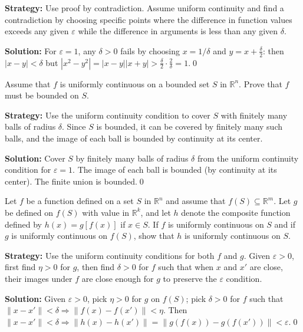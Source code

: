 \noindent\textbf{Strategy:} Use proof by contradiction. Assume uniform continuity and find a contradiction by choosing specific points where the difference in function values exceeds any given $\varepsilon$ while the difference in arguments is less than any given $\delta$.

\bigskip\noindent\textbf{Solution:}
For $\varepsilon=1$, any $\delta>0$ fails by choosing $x=1/\delta$ and $y=x+\tfrac{\delta}{2}$: then $|x-y|<\delta$ but $|x^2-y^2|=|x-y||x+y|>\tfrac{\delta}{2}\cdot\tfrac{2}{\delta}=1$.\qed



\begin{problembox}
Assume that $f$ is uniformly continuous on a bounded set $S$ in $\mathbb{R}^n$. Prove that $f$ must be bounded on $S$.
\end{problembox}

\noindent\textbf{Strategy:} Use the uniform continuity condition to cover $S$ with finitely many balls of radius $\delta$. Since $S$ is bounded, it can be covered by finitely many such balls, and the image of each ball is bounded by continuity at its center.

\bigskip\noindent\textbf{Solution:}
Cover $S$ by finitely many balls of radius $\delta$ from the uniform continuity condition for $\varepsilon=1$. The image of each ball is bounded (by continuity at its center). The finite union is bounded.\qed



\begin{problembox}
Let $f$ be a function defined on a set $S$ in $\mathbb{R}^n$ and assume that $f(S) \subseteq \mathbb{R}^m$. Let $g$ be defined on $f(S)$ with value in $\mathbb{R}^k$, and let $h$ denote the composite function defined by $h(x) = g[f(x)]$ if $x \in S$. If $f$ is uniformly continuous on $S$ and if $g$ is uniformly continuous on $f(S)$, show that $h$ is uniformly continuous on $S$.
\end{problembox}

\noindent\textbf{Strategy:} Use the uniform continuity conditions for both $f$ and $g$. Given $\varepsilon > 0$, first find $\eta > 0$ for $g$, then find $\delta > 0$ for $f$ such that when $x$ and $x'$ are close, their images under $f$ are close enough for $g$ to preserve the $\varepsilon$ condition.

\bigskip\noindent\textbf{Solution:}
Given $\varepsilon>0$, pick $\eta>0$ for $g$ on $f(S)$; pick $\delta>0$ for $f$ such that $\|x-x'\|<\delta\Rightarrow \|f(x)-f(x')\|<\eta$. Then $\|x-x'\|<\delta\Rightarrow \|h(x)-h(x')\|=\|g(f(x))-g(f(x'))\|<\varepsilon$.\qed



